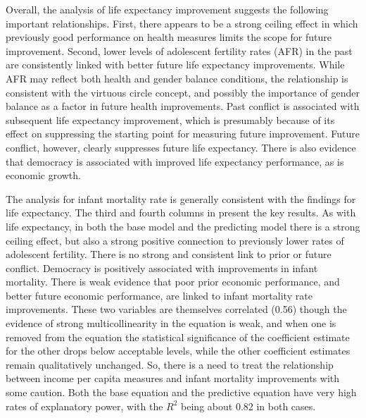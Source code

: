 \documentclass[12pt]{article}
\begin{document}
Overall, the analysis of life expectancy improvement suggests the following important relationships. First, there appears to be a strong ceiling effect in which previously good performance on health measures limits the scope for future improvement. Second, lower levels of adolescent fertility rates (AFR) in the past are consistently linked with better future life expectancy improvements. While AFR may reflect both health and gender balance conditions, the relationship is consistent with the virtuous circle concept, and possibly the importance of gender balance as a factor in future health improvements. Past conflict is associated with subsequent life expectancy improvement, which is presumably because of its effect on suppressing the starting point for measuring future improvement. Future conflict, however, clearly suppresses future life expectancy. There is also evidence that democracy is associated with improved life expectancy performance, as is economic growth.

The analysis for infant mortality rate is generally consistent with the findings for life expectancy. The third and fourth columns in  present the key results. As with life expectancy, in both the base model and the predicting model there is a strong ceiling effect, but also a strong positive connection to previously lower rates of adolescent fertility. There is no strong and consistent link to prior or future conflict. Democracy is positively associated with improvements in infant mortality. There is weak evidence that poor prior economic performance, and better future economic performance, are linked to infant mortality rate improvements. These two variables are themselves correlated (0.56) though the evidence of strong multicollinearity in the equation is weak, and when one is removed from the equation the statistical significance of the coefficient estimate for the other drops below acceptable levels, while the other coefficient estimates remain qualitatively unchanged. So, there is a need to treat the relationship between income per capita measures and infant mortality improvements with some caution. Both the base equation and the predictive equation have very high rates of explanatory power, with the $R^2$ being about 0.82 in both cases.
\end{document}
